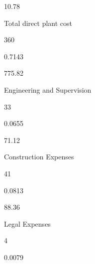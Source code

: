 \documentclass[a4paper,portrait,12pt]{article}
\begin{document}
10.78





\begin{flushleft}
Total direct plant cost
\end{flushleft}





360





0.7143





775.82





\begin{flushleft}
Engineering and Supervision
\end{flushleft}





33





0.0655





71.12





\begin{flushleft}
Construction Expenses
\end{flushleft}





41





0.0813





88.36





\begin{flushleft}
Legal Expenses
\end{flushleft}





4





0.0079
\end{document}
